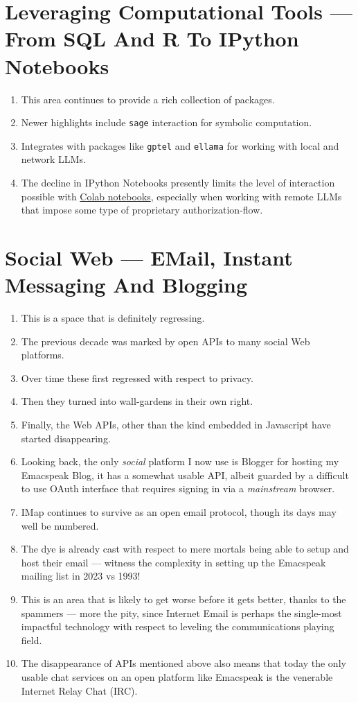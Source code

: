 \documentclass[11pt]{article}
\begin{document}
\section{Leveraging Computational Tools —  From SQL And R To IPython Notebooks}
\label{sec:orgf6224f6}

\begin{enumerate}
\item This area continues to provide a rich collection of  packages.
\item Newer highlights include \texttt{sage} interaction for symbolic computation.
\item Integrates with packages like \texttt{gptel} and \texttt{ellama} for working
with local and network LLMs.
\item The decline in IPython Notebooks presently limits
the level of interaction possible with \href{https://colab.research.google.com/}{Colab notebooks},
especially when working with remote LLMs that impose some type of
proprietary authorization-flow.
\end{enumerate}
\section{Social Web  — EMail, Instant Messaging And Blogging}
\label{sec:org8b6a826}

\begin{enumerate}
\item This is a space that is definitely regressing.
\item The previous decade was marked by open APIs to many social Web platforms.
\item Over time these first regressed with respect to privacy.
\item Then they turned into wall-gardens in their own right.
\item Finally, the Web APIs, other than the kind embedded in Javascript have
started disappearing.
\item Looking back, the only \emph{social} platform I now use is Blogger for
hosting my Emacspeak Blog, it has a somewhat usable API, albeit
guarded by a difficult to use OAuth interface that requires 
signing   in via  a \emph{mainstream} browser.
\item IMap continues to survive as an open email protocol, though its
days may well be numbered.
\item The dye is already cast with respect to mere mortals being able
to setup and  host their email ---  witness the complexity in setting
up the Emacspeak mailing list in 2023 vs 1993!
\item This is an area that is  likely to get worse before it gets
better,  thanks to the spammers  --- more the pity, since Internet Email is perhaps the
single-most impactful technology with respect to leveling the
communications playing field.
\item The disappearance of APIs mentioned above also means that today
the only usable chat services on an open platform like Emacspeak
is the venerable  Internet Relay Chat (IRC).
\end{enumerate}
\end{document}
